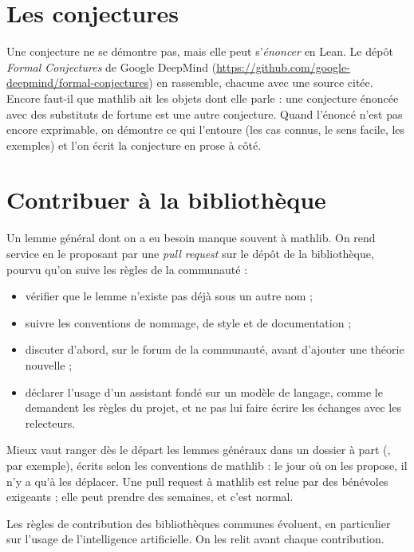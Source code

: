\section{Les conjectures}

Une conjecture ne se démontre pas, mais elle peut s'\emph{énoncer} en Lean. Le dépôt
\emph{Formal Conjectures} de Google DeepMind
(\url{https://github.com/google-deepmind/formal-conjectures}) en rassemble, chacune avec
une source citée. Encore faut-il que mathlib ait les objets dont elle parle : une
conjecture énoncée avec des substituts de fortune est une autre conjecture. Quand
l'énoncé n'est pas encore exprimable, on démontre ce qui l'entoure (les cas connus, le sens
facile, les exemples) et l'on écrit la conjecture en prose à côté.

\section{Contribuer à la bibliothèque}

Un lemme général dont on a eu besoin manque souvent à mathlib. On rend service en le proposant par une
\emph{pull request} sur le dépôt de la bibliothèque, pourvu qu'on suive les règles de la communauté :
\begin{itemize}
  \item vérifier que le lemme n'existe pas déjà sous un autre nom ;
  \item suivre les conventions de nommage, de style et de documentation ;
  \item discuter d'abord, sur le forum de la communauté, avant d'ajouter une théorie
        nouvelle ;
  \item déclarer l'usage d'un assistant fondé sur un modèle de langage, comme le
        demandent les règles du projet, et ne pas lui faire écrire les échanges avec les
        relecteurs.
\end{itemize}

Mieux vaut ranger dès le départ les lemmes généraux dans un dossier à part
(, par exemple), écrits selon les conventions de mathlib : le jour où
on les propose, il n'y a qu'à les déplacer. Une pull request à mathlib est relue par des
bénévoles exigeants ; elle peut prendre des semaines, et c'est normal.

\begin{warningblock}
Les règles de contribution des bibliothèques communes évoluent, en particulier sur l'usage
de l'intelligence artificielle. On les relit avant chaque contribution.
\end{warningblock}

